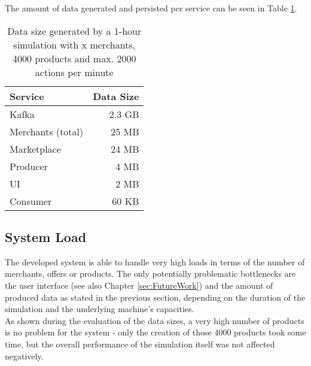 The amount of data generated and persisted per service can be seen in Table \ref{table:generated_data}.

\begin{table}[ht]
\centering
\caption{Data size generated by a 1-hour simulation with x merchants, 4000 products and max. 2000 actions per minute}
\label{table:generated_data}
\begin{tabular}{|l|r|}
\hline
\textbf{Service} & \textbf{Data Size} \\ \hline \hline
Kafka            & 2.3 GB             \\ \hline
Merchants (total)       & 25 MB      \\ \hline
Marketplace      & 24 MB              \\ \hline
Producer         & 4 MB               \\ \hline
UI               & 2 MB               \\ \hline
Consumer         & 60 KB              \\ \hline
\end{tabular}
\end{table}





\subsection{System Load}
\label{sec:system_evaluation}
%
The developed system is able to handle very high loads in terms of the number of merchants, offers or products. The only potentially problematic bottlenecks are the user interface (see also Chapter \ref{sec:FutureWork}) and the amount of produced data as stated in the previous section, depending on the duration of the simulation and the underlying machine's capacities.  \\

As shown during the evaluation of the data sizes, a very high number of products is no problem for the system - only the creation of those 4000 products took some time, but the overall performance of the simulation itself was not affected negatively. 

